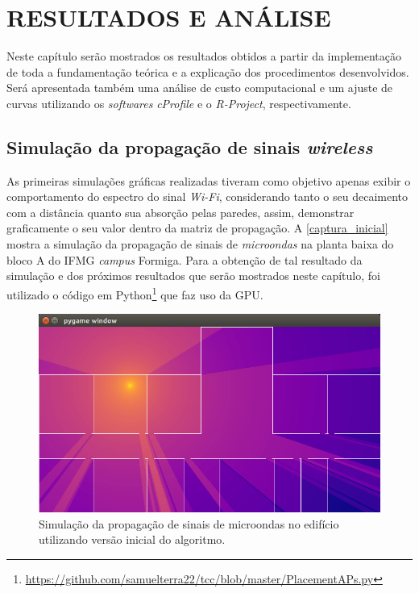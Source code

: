 \documentclass[
	12pt,				%
	twoside,			%
	a4paper,			%
	english,			%
	french,				%
	spanish,			%
	brazil				%
	]{abntex2}
\begin{document}
\chapter{RESULTADOS E ANÁLISE}\label{sec:resultados}

Neste capítulo serão mostrados os resultados obtidos a partir da
implementação de toda a fundamentação teórica e a explicação dos
procedimentos desenvolvidos. Será apresentada também uma análise de
custo computacional e um ajuste de curvas utilizando os \emph{softwares}
\emph{cProfile} e o \emph{R-Project}, respectivamente.

\section{\texorpdfstring{Simulação da propagação de sinais
\emph{wireless}}{Simulação da propagação de sinais wireless}}\label{simulauxe7uxe3o-da-propagauxe7uxe3o-de-sinais-wireless}

As primeiras simulações gráficas realizadas tiveram como objetivo apenas
exibir o comportamento do espectro do sinal \emph{Wi-Fi}, considerando
tanto o seu decaimento com a distância quanto sua absorção pelas
paredes, assim, demonstrar graficamente o seu valor dentro da matriz de
propagação. A \autoref{captura_inicial} mostra a simulação da propagação
de sinais de \emph{microondas} na planta baixa do bloco A do IFMG
\emph{campus} Formiga. Para a obtenção de tal resultado da simulação e
dos próximos resultados que serão mostrados neste capítulo, foi
utilizado o código em Python\footnote{\url{https://github.com/samuelterra22/tcc/blob/master/PlacementAPs.py}}
que faz uso da GPU.

\begin{figure}[ht]
    \caption{\label{captura_inicial} Simulação da propagação de sinais de microondas no edifício utilizando versão inicial do algoritmo. }
    \begin{center}
        \includegraphics[scale=0.6]{imagens/captura-inicial.jpg}
    \end{center}
\end{figure}
\end{document}
